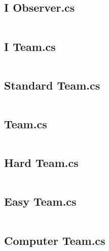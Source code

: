 	\newpage
	
	\subsection{I Observer.cs}
	\inputminted[linenos=true,fontsize=\footnotesize,tabsize=2]{csharp}{../Battleship/Battleship/I_Observer.cs}
	
	\newpage
	
	\subsection{I Team.cs}
	\inputminted[linenos=true,fontsize=\footnotesize,tabsize=2]{csharp}{../Battleship/Battleship/I_Team.cs}
	
	\newpage
	
	\subsection{Standard Team.cs}
	\inputminted[linenos=true,fontsize=\footnotesize,tabsize=2]{csharp}{../Battleship/Battleship/Standard_Team.cs}
	
	\newpage
	
	\subsection{Team.cs}
	\inputminted[linenos=true,fontsize=\footnotesize,tabsize=2]{csharp}{../Battleship/Battleship/Team.cs}
	
	\newpage
	
	\subsection{Hard Team.cs}
	\inputminted[linenos=true,fontsize=\footnotesize,tabsize=2]{csharp}{../Battleship/Battleship/Hard_Team.cs}
	
	\newpage
	
	\subsection{Easy Team.cs}
	\inputminted[linenos=true,fontsize=\footnotesize,tabsize=2]{csharp}{../Battleship/Battleship/Easy_Team.cs}
	
	\newpage
	
	\subsection{Computer Team.cs}
	\inputminted[linenos=true,fontsize=\footnotesize,tabsize=2]{csharp}{../Battleship/Battleship/Computer_Team.cs}
	
